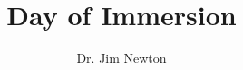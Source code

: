 \documentclass[13pt]{article}
\title{Day of Immersion}
\author{Dr. Jim Newton}
\begin{document}
\maketitle
\begin{spacing}{2.23}










\end{spacing}
\end{document}
